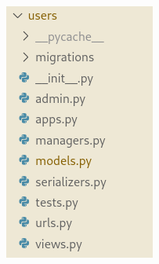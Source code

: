 \begin{figure}[H]
\centering
\begin{minipage}{.5\textwidth}
  \centering
  \includegraphics[width=.75\linewidth]{./Figures/backend-folder1.png}
  \label{backend:folder1}
\end{minipage}%
\begin{minipage}{.5\textwidth}
  \centering

\end{minipage}
\end{figure}
